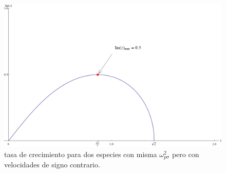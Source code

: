 \documentclass[12pt]{article}
\begin{document}
\begin{figure}
\includegraphics[height=0.3\paperheight]{grafica_misma_omega_flecha.png}
\caption{tasa de crecimiento para dos especies con misma $\omega_{p\sigma}^2$ pero con velocidades de signo contrario.}
\label{fig:misma_omega_tasa_de_crecimiento}
\end{figure}
\end{document}
